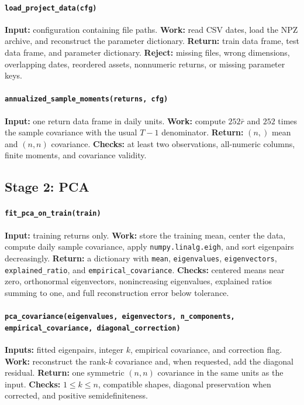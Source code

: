 \documentclass[10pt]{article}
\begin{document}
\begin{sloppypar}
\paragraph{\texttt{load\_project\_data(cfg)}}
\textbf{Input:} configuration containing file paths.
\textbf{Work:} read CSV dates, load the NPZ archive, and reconstruct the
parameter dictionary. \textbf{Return:} train data frame, test data frame, and
parameter dictionary. \textbf{Reject:} missing files, wrong dimensions,
overlapping dates, reordered assets, nonnumeric returns, or missing parameter
keys.

\paragraph{\texttt{annualized\_sample\_moments(returns, cfg)}}
\textbf{Input:} one return data frame in daily units.
\textbf{Work:} compute $252\bar r$ and $252$ times the sample covariance with
the usual $T-1$ denominator. \textbf{Return:} $(n,)$ mean and $(n,n)$
covariance. \textbf{Checks:} at least two observations, all-numeric columns,
finite moments, and covariance validity.

\subsection*{Stage 2: PCA}

\paragraph{\texttt{fit\_pca\_on\_train(train)}}
\textbf{Input:} training returns only. \textbf{Work:} store the training mean,
center the data, compute daily sample covariance, apply
\texttt{numpy.linalg.eigh}, and sort eigenpairs decreasingly.
\textbf{Return:} a dictionary with \texttt{mean}, \texttt{eigenvalues},
\texttt{eigenvectors}, \texttt{explained\_ratio}, and
\texttt{empirical\_covariance}. \textbf{Checks:} centered means near zero,
orthonormal eigenvectors, nonincreasing eigenvalues, explained ratios summing
to one, and full reconstruction error below tolerance.

\paragraph{\texttt{pca\_covariance(eigenvalues, eigenvectors, n\_components,
empirical\_covariance, diagonal\_correction)}}
\textbf{Inputs:} fitted eigenpairs, integer $k$, empirical covariance, and
correction flag. \textbf{Work:} reconstruct the rank-$k$ covariance and,
when requested, add the diagonal residual.
\textbf{Return:} one symmetric $(n,n)$ covariance in the same units as the
input. \textbf{Checks:} $1\leq k\leq n$, compatible shapes, diagonal
preservation when corrected, and positive semidefiniteness.


\end{sloppypar}
\end{document}
